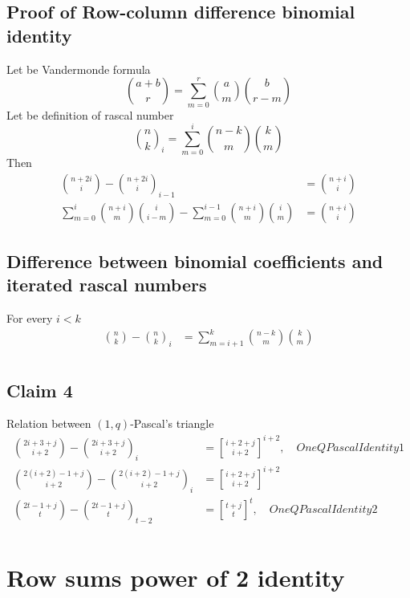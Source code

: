 \documentclass[12pt,letterpaper,oneside,reqno]{amsart}
\newcommand \rascalNumber [3] {\binom{#1}{#2}_{#3}}
\newcommand{\genstirlingI}[3]{%
    \genfrac{[}{]}{0pt}{#1}{#2}{#3}%
}
\newcommand{\oneQBinomial}[3]{\genstirlingI{}{#1}{#2}^{#3}}
\numberwithin{equation}{section}
\begin{document}
\subsection{Proof of Row-column difference binomial identity}
Let be Vandermonde formula
\begin{equation*}
    \binom{a+b}{r} = \sum_{m=0}^{r} \binom{a}{m} \binom{b}{r-m}
\end{equation*}
Let be definition of rascal number
\begin{equation*}
    \rascalNumber{n}{k}{i} = \sum_{m=0}^{i} \binom{n-k}{m} \binom{k}{m}
\end{equation*}
Then
\begin{align*}
    \binom{n+2i}{i} - \rascalNumber{n+2i}{i}{i-1} &= \binom{n+i}{i}\\
    \sum_{m=0}^{i} \binom{n+i}{m} \binom{i}{i-m} - \sum_{m=0}^{i-1} \binom{n+i}{m} \binom{i}{m} &= \binom{n+i}{i}
\end{align*}

\subsection{Difference between binomial coefficients and iterated rascal numbers}
For every $i < k$
\begin{align*}
    \binom{n}{k} - \rascalNumber{n}{k}{i} &= \sum_{m=i+1}^{k} \binom{n-k}{m} \binom{k}{m} \\
\end{align*}

\subsection{Claim 4} Relation between $(1,q)$-Pascal's triangle
\begin{align*}
    \binom{2i+3+j}{i+2} - \rascalNumber{2i+3+j}{i+2}{i} &= \oneQBinomial{i+2+j}{i+2}{i+2}, \quad OneQPascalIdentity1 \\
    \binom{2(i+2)-1+j}{i+2} - \rascalNumber{2(i+2)-1+j}{i+2}{i} &= \oneQBinomial{i+2+j}{i+2}{i+2} \\
    \binom{2t-1+j}{t} - \rascalNumber{2t-1+j}{t}{t-2} &= \oneQBinomial{t+j}{t}{t}, \quad OneQPascalIdentity2 \\
\end{align*}

\section{Row sums power of 2 identity}



%
\end{document}
